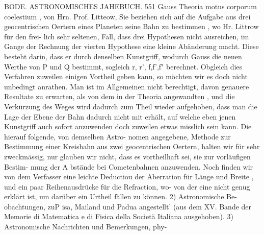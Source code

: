 \documentclass[12pt,a4paper]{article}
\begin{document}
\newpage
BODE. ASTRONOMISCHES JAHEBUCH. 551\newline
Gauss Theoria motus corporum coelestium , von Hrn. Prof. Litteow, Sie beziehen sich auf die Aufgabe\newline
aus drei geocentrischen Oertern eines Planeten seine Bahn zu bestimmen , wo Hr. Littrow für den frei-\newline
lich sehr seltenen, Fall, dass drei Hypothesen nicht ausreichen, im Gange der Rechnung der vierten\newline
Hypothese eine kleine Abänderung macht. Diese besteht darin, dass er durch denselben Kunstgriff,\newline
wodurch Gauss die neuen Werthe von P und Q bestimmt, sogleich r, r', f,f',f" berechnet. Obgleich\newline
dies Verfahren zuweilen einigen Vortheil geben kann, so möchten wir es doch nicht unbedingt anrathen.\newline
Man ist im Allgemeinen nicht berechtigt, davon genauere Resultate zu erwarten, als von dem in der\newline
Theoria angewandten , und die Verkürzung des Weges wird dadurch zum Theil wieder aufgehoben, dass\newline
man die Lage der Ebene der Bahn dadurch nicht mit erhält, auf welche eben jenen Kunstgriff auch\newline
sofort anzuwenden doch zuweilen etwas misslich sein kann. Die hierauf folgende, von demselben Astro-\newline
nomen angegebene, Methode zur Bestimmung einer Kreisbahn aus zwei geocentrischen Oertern, halten\newline
wir für sehr zweckmässig, nur glauben wir nicht, dass es vortheilhaft sei, sie zur vorläufigen Bestim-\newline
mung der A bstände bei Cometenbahnen anzuwenden. Noch finden wir von dem Verfasser eine leichte\newline
Deductiou der Aberration für Länge und Breite , und ein paar Reihenausdrücke für die Refraction, wo-\newline
von der eine nicht genug erklärt ist, um darüber ein Urtheil fällen zu können. 2) Astronomische Be-\newline
obachtungen, zuP isa, Mailand und Padua angestellt' (aus dem XV. Bande der Memorie di Matematica\newline
e di Fisica della Societä Italiana ausgehoben). 3) Astronomische Nachrichten und Bemerkungen, phy-\newline
\end{document}
